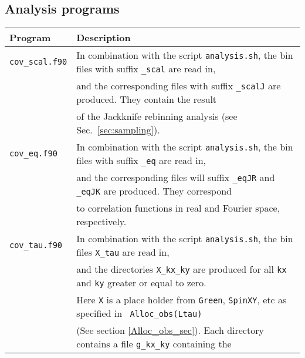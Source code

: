 
\subsection{ Analysis programs }\label{sec:analysis}
%
\begin{table}[h]
  \begin{tabular}{@{} l l @{}}\toprule
   Program & Description \\\midrule
   \texttt{cov\_scal.f90}  &  In combination with the script \texttt{analysis.sh}, the bin files with suffix \texttt{\_scal} are read in, \\
                           & and  the corresponding files with suffix \texttt{\_scalJ} are produced. They  contain the  result \\
                           & of the Jackknife rebinning analysis  (see Sec.~\ref{sec:sampling}).  \\
   \texttt{cov\_eq.f90}    &  In combination with the script \texttt{analysis.sh}, the bin files with suffix \texttt{\_eq} are read in, \\
                           & and   the corresponding files will suffix  \texttt{\_eqJR}  and  \texttt{\_eqJK}  are produced. They  correspond \\
                           & to correlation functions in real and Fourier space, respectively.  \\
   \texttt{cov\_tau.f90}   &  In combination with the script \texttt{analysis.sh}, the bin files  \texttt{X\_tau} are read in, \\
                           & and the directories  \texttt{X\_kx\_ky} are produced  for all \texttt{kx} and \texttt{ky} greater or equal to zero. \\
                           & Here \texttt{X}  is a place holder from \texttt{Green}, \texttt{SpinXY}, etc   as specified in \texttt{ Alloc\_obs(Ltau)} \\
                           & (See section \ref{Alloc_obs_sec}). Each directory contains  a  file    \texttt{g\_kx\_ky}  containing the  \\

\end{tabular}
\end{table}
